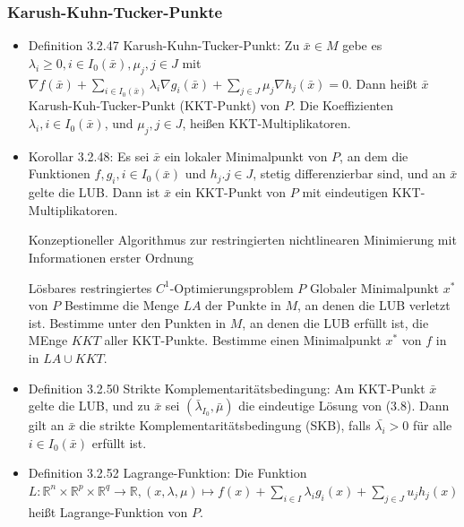 \documentclass[paper=a4, fontsize=11pt]{scrartcl} %
\numberwithin{equation}{section} %
\numberwithin{figure}{section} %
\numberwithin{table}{section} %
\begin{document}
\subsubsection{Karush-Kuhn-Tucker-Punkte}

\begin{itemize}
  \item Definition 3.2.47 Karush-Kuhn-Tucker-Punkt: Zu $\bar{x} \in M$ gebe es $\lambda_i \ge 0, i \in I_0(\bar{x}), \mu_j, j\in J$ mit $\nabla f(\bar{x}) + \sum\limits_{i \in I_0(\bar{x})} \lambda_i \nabla g_i(\bar{x}) + \sum\limits_{j \in J} \mu_j \nabla h_j(\bar{x}) = 0$. Dann heißt $\bar{x}$ Karush-Kuh-Tucker-Punkt (KKT-Punkt) von $P$. Die Koeffizienten $\lambda_i, i \in I_0(\bar{x})$, und $\mu_j, j \in J$, heißen KKT-Multiplikatoren.
  \item Korollar 3.2.48: Es sei $\bar{x}$ ein lokaler Minimalpunkt von $P$, an dem die Funktionen $f, g_i, i \in I_0(\bar{x})$ und $h_j. j \in J$, stetig differenzierbar sind, und an $\bar{x}$ gelte die LUB. Dann ist $\bar{x}$ ein KKT-Punkt von $P$ mit eindeutigen KKT-Multiplikatoren.
  \begin{algorithm}
  \caption{Konzeptioneller Algorithmus zur restringierten nichtlinearen Minimierung mit Informationen erster Ordnung}
  \begin{algorithmic}[1]
    \Require Lösbares restringiertes $C^1$-Optimierungsproblem $P$
    \Ensure Globaler Minimalpunkt $x^*$ von $P$
    \State Bestimme die Menge $LA$ der Punkte in $M$, an denen die LUB verletzt ist.
    \State Bestimme unter den Punkten in $M$, an denen die LUB erfüllt ist, die MEnge $KKT$ aller KKT-Punkte.
    \State Bestimme einen Minimalpunkt $x^*$ von $f$ in in $LA \cup KKT$.
  \end{algorithmic}
  \end{algorithm}
  \item Definition 3.2.50 Strikte Komplementaritätsbedingung: Am KKT-Punkt $\bar{x}$ gelte die LUB, und zu $\bar{x}$ sei $(\bar{\lambda}_{I_0},\bar{\mu})$ die eindeutige Lösung von (3.8). Dann gilt an $\bar{x}$ die strikte Komplementaritätsbedingung (SKB), falls $\bar{\lambda_i} > 0$ für alle $i \in I_0(\bar{x})$ erfüllt ist.
  \item Definition 3.2.52 Lagrange-Funktion: Die Funktion $L: \mathbb{R}^n \times \mathbb{R}^p \times \mathbb{R}^q \rightarrow \mathbb{R}, (x,\lambda,\mu) \mapsto	f(x) + \sum\limits_{i \in I} \lambda_i g_i(x) + \sum\limits_{j \in J} u_j h_j(x)$ heißt Lagrange-Funktion von $P$.
\end{itemize}
\end{document}
